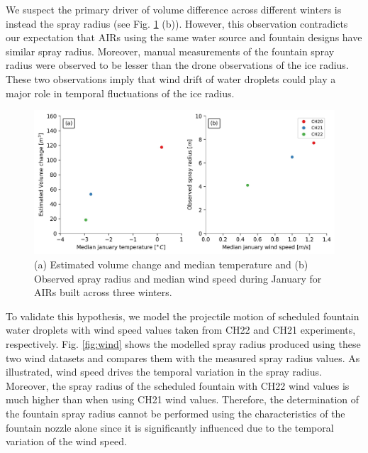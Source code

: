 \documentclass[tc, manuscript]{copernicus}
\begin{document}
We suspect the primary driver of volume difference across different winters is instead the spray radius (see
Fig. \ref{fig:CH_diffs} (b)). However, this observation contradicts our expectation that AIRs using the same
water source and fountain designs have similar spray radius. Moreover, manual measurements of the fountain spray
radius were observed to be lesser than the drone observations of the ice radius. These two observations imply
that wind drift of water droplets could play a major role in temporal fluctuations of the ice radius.

\begin{figure}[t]
\includegraphics[width=\textwidth]{Figures/CH_diffs.jpg}

\caption{(a) Estimated volume change and median temperature and (b) Observed spray radius and median wind speed
during January for AIRs built across three winters. } 

\label{fig:CH_diffs} 
\end{figure}

To validate this hypothesis, we model the projectile motion of scheduled fountain water droplets with wind speed
values taken from CH22 and CH21 experiments, respectively. Fig. \ref{fig:wind} shows the modelled spray radius
produced using these two wind datasets and compares them with the measured spray radius values. As illustrated,
wind speed drives the temporal variation in the spray radius. Moreover, the spray radius of the scheduled
fountain with CH22 wind values is much higher than when using CH21 wind values. Therefore, the determination of
the fountain spray radius cannot be performed using the characteristics of the fountain nozzle alone since it is
significantly influenced due to the temporal variation of the wind speed.
\end{document}
